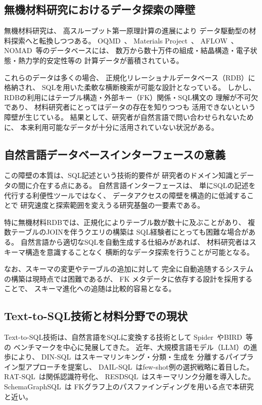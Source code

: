 \documentclass[5p,twocolumn]{elsarticle}
\begin{document}
\subsection{無機材料研究におけるデータ探索の障壁}

無機材料研究は、
高スループット第一原理計算の進展により
データ駆動型の材料探索へと転換しつつある。
OQMD~\cite{saal2013oqmd,kirklin2015oqmd}、
Materials Project~\cite{jain2013mp}、
AFLOW~\cite{curtarolo2012aflow}、
NOMAD~\cite{draxl2019nomad}等のデータベースには、
数万から数十万件の組成・結晶構造・電子状態・熱力学的安定性等の
計算データが蓄積されている。

これらのデータは多くの場合、
正規化リレーショナルデータベース（RDB）に格納され、
SQLを用いた柔軟な横断検索が可能な設計となっている。
しかし、RDBの利用にはテーブル構造・外部キー（FK）関係・SQL構文の
理解が不可欠であり、
材料研究者にとってはデータの存在を知りつつも
活用できないという障壁が生じている。
結果として、研究者が自然言語で問い合わせられないために、
本来利用可能なデータが十分に活用されていない状況がある。

\subsection{自然言語データベースインターフェースの意義}

この障壁の本質は、SQL記述という技術的要件が
研究者のドメイン知識とデータの間に介在する点にある。
自然言語インターフェースは、
単にSQLの記述を代行する利便性ツールではなく、
データアクセスの障壁を構造的に低減することで
研究速度と探索範囲を変えうる研究基盤の一要素である。

特に無機材料RDBでは、正規化によりテーブル数が数十に及ぶことがあり、
複数テーブルのJOINを伴うクエリの構築は
SQL経験者にとっても困難な場合がある。
自然言語から適切なSQLを自動生成する仕組みがあれば、
材料研究者はスキーマ構造を意識することなく
横断的なデータ探索を行うことが可能となる。

なお、スキーマの変更やテーブルの追加に対して
完全に自動追随するシステムの構築は現時点では困難であるが、
FK メタデータに依存する設計を採用することで、
スキーマ進化への追随は比較的容易となる。

\subsection{Text-to-SQL技術と材料分野での現状}

Text-to-SQL技術は、自然言語をSQLに変換する技術として
Spider~\cite{yu2018spider}やBIRD~\cite{li2024bird}等の
ベンチマークを中心に発展してきた。
近年、大規模言語モデル（LLM）の進歩により、
DIN-SQL~\cite{pourreza2024dinsql}はスキーマリンキング・分類・生成を
分離するパイプライン型アプローチを提案し、
DAIL-SQL~\cite{gao2023dail}はfew-shot例の選択戦略に着目した。
RAT-SQL~\cite{wang2020ratsql}は関係認識符号化、
RESDSQL~\cite{li2023resdsql}はスキーマリンク分離を導入した。
SchemaGraphSQL~\cite{safdarian2026schemagraphsql}は
FKグラフ上のパスファインディングを用いる点で本研究と近い。
\end{document}
